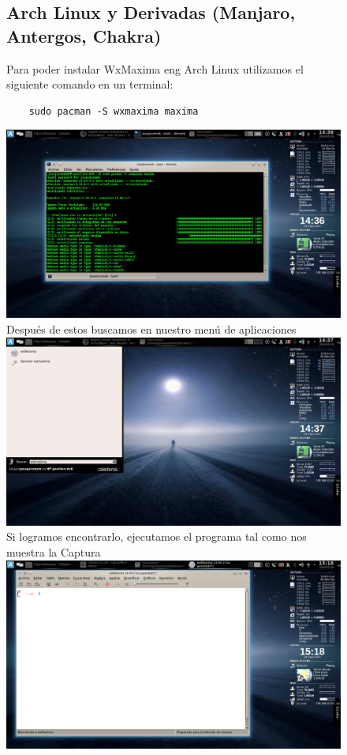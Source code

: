\documentclass[10pt,a4paper]{book}
\begin{document}
\begin{small}
\begin{figure}[htb]
\subsection{Arch Linux y Derivadas (Manjaro, Antergos, Chakra)}
Para poder instalar WxMaxima eng Arch Linux utilizamos el siguiente comando en un terminal:
\begin{center}
	\begin{lstlisting}
	sudo pacman -S wxmaxima maxima
\end{lstlisting}
\end{center}\includegraphics[scale=0.30]{fotos/Maxima.png} \\
Después de estos buscamos en nuestro menú de aplicaciones\\ 
\includegraphics[scale=0.30]{fotos/Maxima1.png} \\
Si logramos encontrarlo, ejecutamos el programa tal como nos muestra la Captura\\ 
\includegraphics[scale=0.35]{fotos/Maxima2.png} \\

\end{figure}
\end{small}
\end{document}
